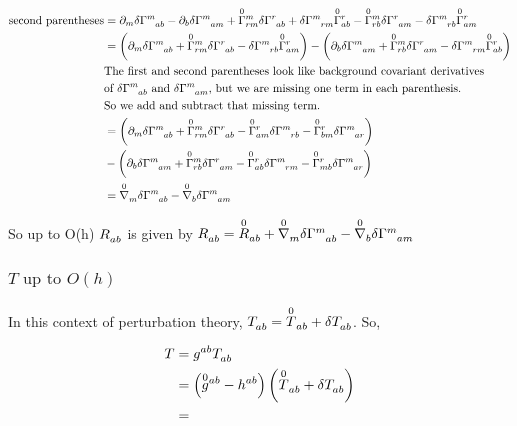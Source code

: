 \begin{align*}
    \text{second parentheses} &=\partial_m \tt{\delta\Gamma}{m}{ab}- \partial_b \tt{\delta\Gamma}{m}{am}+\ttw{\overset{0}{\Gamma}{}}{m}{rm}\tt{\delta\Gamma}{r}{ab}+\tt{\delta\Gamma}{m}{rm}\ttw{\overset{0}{\Gamma}{}}{r}{ab}-\ttw{\overset{0}{\Gamma}{}}{m}{rb}\tt{\delta\Gamma}{r}{am}-\tt{\delta\Gamma}{m}{rb}\ttw{\overset{0}{\Gamma}{}}{r}{am} \\
    &= \lera{\partial_m \tt{\delta\Gamma}{m}{ab} +\ttw{\overset{0}{\Gamma}{}}{m}{rm}\tt{\delta\Gamma}{r}{ab} -\tt{\delta\Gamma}{m}{rb}\ttw{\overset{0}{\Gamma}{}}{r}{am} } -\lera{\partial_b \tt{\delta\Gamma}{m}{am}+\ttw{\overset{0}{\Gamma}{}}{m}{rb}\tt{\delta\Gamma}{r}{am}-\tt{\delta\Gamma}{m}{rm}\ttw{\overset{0}{\Gamma}{}}{r}{ab}} \\
    & \text{The first and second parentheses look like background covariant derivatives  } \\
    &\text{of $\tt{\delta\Gamma}{m}{ab}$ and $\tt{\delta\Gamma}{m}{am}$, but we are missing one term in each parenthesis. }\\
    & \text{So we add and subtract that missing term.}\\
    &= \lera{\partial_m \tt{\delta\Gamma}{m}{ab} +\ttw{\overset{0}{\Gamma}{}}{m}{rm}\tt{\delta\Gamma}{r}{ab} -\ttw{\overset{0}{\Gamma}{}}{r}{am}\tt{\delta\Gamma}{m}{rb} -\ttw{\overset{0}{\Gamma}{}}{r}{bm}\tt{\delta\Gamma}{m}{ar}}\\ 
    &-\lera{\partial_b \tt{\delta\Gamma}{m}{am}+\ttw{\overset{0}{\Gamma}{}}{m}{rb}\tt{\delta\Gamma}{r}{am}-\ttw{\overset{0}{\Gamma}{}}{r}{ab}\tt{\delta\Gamma}{m}{rm}-\ttw{\overset{0}{\Gamma}{}}{r}{mb}\tt{\delta\Gamma}{m}{ar}} \\
    &= \tt{\overset{0}{\nabla}}{}{m}\tt{\delta\Gamma}{m}{ab} - \tt{\overset{0}{\nabla}}{}{b}\tt{\delta\Gamma}{m}{am} \\
\end{align*}



So up to O(h) $\tt{R}{}{ab}$ is given by $\tt{R}{}{ab}= \tt{\overset{0}{R}}{}{ab}+\tt{\overset{0}{\nabla}}{}{m}\tt{\delta\Gamma}{m}{ab} - \tt{\overset{0}{\nabla}}{}{b}\tt{\delta\Gamma}{m}{am}$



\subsubsection{$T\text{ up to } O(h)$}


In this context of perturbation theory, $\tt{T}{}{ab}= \tt{\overset{0}{T}}{}{ab}+\delta\tt{T}{}{ab}$. So,

\begin{align*}
    T &= \tt{g}{ab}{}\tt{T}{}{ab}\\
    &=\lera{\tt{\overset{0}{g}{}}{ab}{}-\tt{h}{ab}{}}\lera{\tt{\overset{0}{T}}{}{ab}+\delta\tt{T}{}{ab}}\\
    &= 
\end{align*}